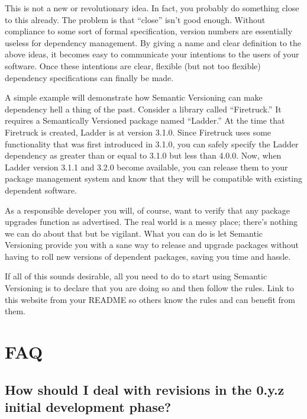 \documentclass[a4paper,12pt,notitlepage,twoside,openright]{article}
\begin{document}
This is not a new or revolutionary idea. In fact, you probably do
something close to this already. The problem is that ``close'' isn't
good enough. Without compliance to some sort of formal specification,
version numbers are essentially useless for dependency management. By
giving a name and clear definition to the above ideas, it becomes easy
to communicate your intentions to the users of your software. Once these
intentions are clear, flexible (but not too flexible) dependency
specifications can finally be made.

A simple example will demonstrate how Semantic Versioning can make
dependency hell a thing of the past. Consider a library called
``Firetruck.'' It requires a Semantically Versioned package named
``Ladder.'' At the time that Firetruck is created, Ladder is at version
3.1.0. Since Firetruck uses some functionality that was first introduced
in 3.1.0, you can safely specify the Ladder dependency as greater than
or equal to 3.1.0 but less than 4.0.0. Now, when Ladder version 3.1.1
and 3.2.0 become available, you can release them to your package
management system and know that they will be compatible with existing
dependent software.

As a responsible developer you will, of course, want to verify that any
package upgrades function as advertised. The real world is a messy
place; there's nothing we can do about that but be vigilant. What you
can do is let Semantic Versioning provide you with a sane way to release
and upgrade packages without having to roll new versions of dependent
packages, saving you time and hassle.

If all of this sounds desirable, all you need to do to start using
Semantic Versioning is to declare that you are doing so and then follow
the rules. Link to this website from your README so others know the
rules and can benefit from them.

\hypertarget{faq}{%
\section{FAQ}\label{faq}}

\hypertarget{how-should-i-deal-with-revisions-in-the-0.y.z-initial-development-phase}{%
\subsection{How should I deal with revisions in the 0.y.z initial
development
phase?}\label{how-should-i-deal-with-revisions-in-the-0.y.z-initial-development-phase}}
\end{document}

